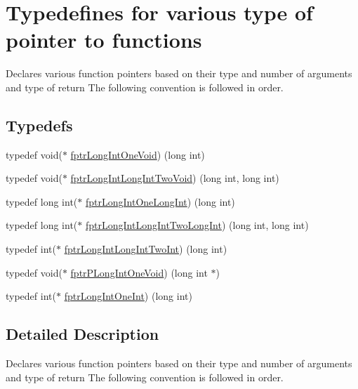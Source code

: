 \hypertarget{group__typedef_group}{}\section{Typedefines for various type of pointer to functions}
\label{group__typedef_group}


Declares various function pointers based on their type and number of arguments and type of return The following convention is followed in order.  


\subsection*{Typedefs}
\begin{DoxyCompactItemize}
\item 
typedef void($\ast$ \hyperlink{group__typedef_group_ga3bd969ff6cd52b00d54500638dffb379}{fptr\+Long\+Int\+One\+Void}) (long int)
\item 
typedef void($\ast$ \hyperlink{group__typedef_group_gac41973fac47233da48589a3cc3398b51}{fptr\+Long\+Int\+Long\+Int\+Two\+Void}) (long int, long int)
\item 
typedef long int($\ast$ \hyperlink{group__typedef_group_ga2fcac75b66a8e69e0de28880cc60ba7f}{fptr\+Long\+Int\+One\+Long\+Int}) (long int)
\item 
typedef long int($\ast$ \hyperlink{group__typedef_group_ga38e424990ad08db2dfae4135eebda12f}{fptr\+Long\+Int\+Long\+Int\+Two\+Long\+Int}) (long int, long int)
\item 
typedef int($\ast$ \hyperlink{group__typedef_group_ga61711f6fdcc29325f1212e26845b466f}{fptr\+Long\+Int\+Long\+Int\+Two\+Int}) (long int)
\item 
typedef void($\ast$ \hyperlink{group__typedef_group_ga15b0509ad469369c2107f96d532aa5d5}{fptr\+P\+Long\+Int\+One\+Void}) (long int $\ast$)
\item 
typedef int($\ast$ \hyperlink{group__typedef_group_ga870022f202fc4309fe0b4f4b9bddbb51}{fptr\+Long\+Int\+One\+Int}) (long int)
\end{DoxyCompactItemize}


\subsection{Detailed Description}
Declares various function pointers based on their type and number of arguments and type of return The following convention is followed in order. 



